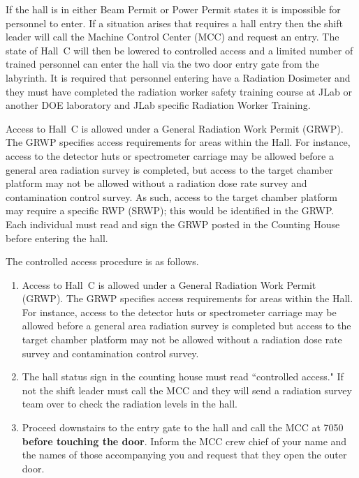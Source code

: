 {If the hall is in either Beam Permit or Power Permit states it is impossible
for personnel to enter. If a situation arises that requires a hall entry
then the shift leader will call the Machine Control Center (MCC) and
request an entry. The state of Hall~C will then be lowered to
controlled access and a limited number of trained personnel can enter
the hall via the two door entry gate from the labyrinth. It
is required that personnel entering have a  Radiation Dosimeter
and they must have completed the radiation worker safety training
course at JLab or another DOE laboratory and JLab specific Radiation Worker
Training.

Access to Hall~C is allowed under a General Radiation Work Permit (GRWP).  The 
GRWP specifies access requirements for areas within the Hall.  For instance, access to the 
detector huts or spectrometer carriage may be allowed before a general area radiation 
survey is completed, but access to the target chamber platform may not be allowed 
without a radiation dose rate survey and contamination control survey.  As such, access to 
the target chamber platform may require a specific RWP (SRWP); this would be identified 
in the GRWP.  Each individual must read and sign the GRWP posted in the Counting 
House before entering the hall.

The controlled access procedure is as follows.
\begin{enumerate}

\item{Access to Hall~C is allowed under a General  Radiation Work Permit (GRWP). The GRWP  specifies access requirements for areas within the Hall. For instance, access to the detector huts or spectrometer carriage may be allowed before a general area radiation survey is completed but access to the target chamber platform may not be allowed without a radiation dose rate survey and contamination control survey.}

\item{The hall status sign in the counting house must
read ``controlled access." If not the shift leader must call the MCC
and they will send a radiation survey team over to check the
radiation levels in the hall.}

\item{Proceed downstairs to the entry gate to the hall
and call the MCC at 7050 {\bf before touching the door}. Inform the
MCC crew chief of your name and the names of those accompanying you
and request that they open the outer door.}


\end{enumerate}}
